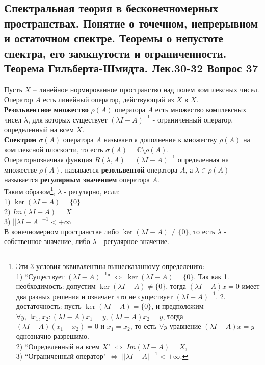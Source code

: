 \documentclass{article}
\begin{document}
\subsection{Спектральная теория в бесконечномерных пространствах. Понятие о точечном, непрерывном и остаточном спектре. Теоремы о непустоте спектра, его замкнутости и ограниченности. Теорема Гильберта-Шмидта. Лек.30-32 \textbf{Вопрос 37}}
	Пусть $X$ – линейное нормированное пространство над полем комплексных чисел. Оператор $A$ есть линейный оператор, действующий из $X$ в $X$.\\
	\textbf{Резольвентное множество} $\rho(A)$ оператора $A$ есть множество комплексных чисел $\lambda$, для которых существует ${(\lambda I-A)}^{-1}$ - ограниченный оператор, определенный на всем $X$. \\
	\textbf{Спектром} $\sigma(A)$ оператора $A$ называется дополнение к множеству $\rho(A)$ на комплексной плоскости, то есть $\sigma(A)=\mathbb{C}\setminus \rho(A)$.\\
	Операторнозначная функция $R(\lambda,A)={(\lambda I-A)}^{-1}$ определенная на множестве $\rho(A)$, называется \textbf{резольвентой} оператора $A$, а $\lambda \in \rho(A)$ называется \textbf{регулярным значением} оператора $A$.\\
	Таким образом\footnote{Эти 3 условия эквивалентны вышесказанному определению:\\
	1) ``Существует ${(\lambda I-A)}^{-1}$" $\Leftrightarrow$ $\ker (\lambda I-A)=\{0\}$. Так как 1. необходимость: допустим $\ker (\lambda I-A)\ne \{0\}$, тогда $(\lambda I-A)x=0$ имеет два разных решения и означает что не существует ${(\lambda I-A)}^{-1}$. 2. достаточность: пусть $\ker (\lambda I-A)=\{0\}$, и предположим $\forall y, \exists {x}_{1}, {x}_{2}: (\lambda I-A){x}_{1}=y, (\lambda I-A){x}_{2}=y$, тогда $(\lambda I-A)({x}_{1}-{x}_{2})=0$ и ${x}_{1}={x}_{2}$, то есть $\forall y$ уравнение $(\lambda I-A)x=y$ однозначно разрешимо.\\
	2) ``Определенный на всем $X$" $\Leftrightarrow$ $Im(\lambda I-A)=X$,\\
	3) ``Ограниченный оператор" $\Leftrightarrow$ ${||\lambda I-A||}^{-1}<+\infty$.}, $\lambda$ - регулярно, если:\\
	1) $\ker (\lambda I-A)=\{0\}$\\
	2) $Im(\lambda I-A)=X$\\
	3) ${||\lambda I-A||}^{-1}<+\infty$\\
	В конечномерном пространстве либо $\ker (\lambda I-A)\ne \{0\}$, то есть $\lambda$ - собственное значение, либо $\lambda$ - регулярное значение.\\
\end{document}
